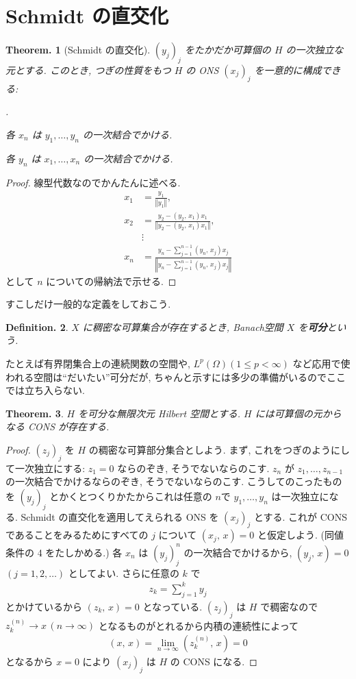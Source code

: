 \documentclass[openany, a4paper, oneside]{jsbook}
\newcounter{enum2}
\renewenvironment{enumerate}{%
\begin{list}%
{%
\arabic{enum2}.\ \,%
}%
{%
\usecounter{enum2}
\setlength{\itemindent}{0pt}%
\setlength{\leftmargin}{15pt}%
\setlength{\rightmargin}{0pt}%
\setlength{\labelsep}{0pt}%
\setlength{\labelwidth}{6pt}%
\setlength{\itemsep}{0pt}%
\setlength{\parsep}{0pt}%
\setlength{\listparindent}{0pt}%
}
}{%
\end{list}%
}
\theoremstyle{break}
\newtheorem{thm}{Theorem.}[section]
\theoremstyle{breakdefn}
\newtheorem{defn}[thm]{Definition.}
\newcommand{\norm}[1]{\left\Vert#1\right\Vert}
\newcommand{\rbkt}[2]{\left ( #1,\,#2 \right)}
\begin{document}
\section{Schmidt の直交化}


\begin{thm}[Schmidt の直交化]
 $(y_j)_j$ をたかだか可算個の $H$ の一次独立な元とする.
 このとき, つぎの性質をもつ $H$ の ONS $(x_j)_j$ を一意的に構成できる:
\begin{enumerate}
\item 各 $x_n$ は $y_1, \dots, y_n$ の一次結合でかける.
\item 各 $y_n$ は $x_1, \dots, x_n$ の一次結合でかける.
\end{enumerate}
\end{thm}
\begin{proof}
線型代数なのでかんたんに述べる.
\begin{align}
 x_1
 &=
 \frac{y_1}{\norm{y_1}}, \\
 x_2
 &=
 \frac{y_2 - \rbkt{y_2}{x_1}x_1}{\norm{y_2 - \rbkt{y_2}{x_1}x_1}}, \\
 &\vdots \\
 x_n
 &=
 \frac{y_n - \sum_{j=1}^{n-1} \rbkt{y_n}{x_j} x_j}{\norm{y_n - \sum_{j=1}^{n-1} \rbkt{y_n}{x_j} x_j}}
\end{align}
として $n$ についての帰納法で示せる.
\end{proof}

すこしだけ一般的な定義をしておこう.
\begin{defn}
$X$ に稠密な可算集合が存在するとき,
Banach空間 $X$ を\textbf{可分}という.
\end{defn}
たとえば有界閉集合上の連続関数の空間や,
$L^p(\Omega) (1 \le p < \infty)$
など応用で使われる空間は``だいたい''可分だが,
ちゃんと示すには多少の準備がいるのでここでは立ち入らない.

\begin{thm}
 $H$ を可分な無限次元 Hilbert 空間とする.
 $H$ には可算個の元からなる CONS が存在する.
\end{thm}
\begin{proof}
$(z_j)_j$ を $H$ の稠密な可算部分集合としよう.
まず, これをつぎのようにして一次独立にする:
$z_1 = 0$ ならのぞき, そうでないならのこす.
$z_n$ が $z_1, \dots, z_{n-1}$ の一次結合でかけるならのぞき,
そうでないならのこす.
こうしてのこったものを $(y_j)_j$ とかくとつくりかたからこれは任意の $n$で $y_1, \dots, y_n$ は一次独立になる.
Schmidt の直交化を適用してえられる ONS を $(x_j)_j$ とする.
これが CONS であることをみるためにすべての $j$ について $\rbkt{x_j}{x} = 0$ と仮定しよう.
(同値条件の 4 をたしかめる.)
各 $x_n$ は $(y_j)_j^n$ の一次結合でかけるから,
$\rbkt{y_j}{x} = 0$ $(j = 1, 2, \dots)$ としてよい.
さらに任意の $k$ で
\begin{align}
 z_k
 =
 \sum_{j=1}^k y_j
\end{align}
とかけているから $\rbkt{z_k}{x} = 0$ となっている.
$(z_j)_j$ は $H$ で稠密なので $z_k^{(n)} \to x \, (n \to \infty)$ となるものがとれるから内積の連続性によって
\begin{align}
 \rbkt{x}{x}
 =
 \lim_{n \to \infty} \rbkt{z_k^{(n)}}{x}
 =
 0
\end{align}
となるから $x=0$ により $(x_j)_j$ は $H$ の CONS になる.
\end{proof}
\end{document}
